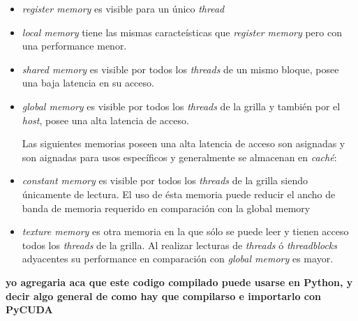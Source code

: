 \begin{itemize}
	\item  \textit{register memory} es visible para un único \textit{thread}
	\item \textit{local memory} tiene las mismas caracteísticas que \textit{register memory} pero con una performance menor.
	\item \textit{shared memory} es visible por todos los \textit{threads} de un mismo bloque, posee una baja latencia en su acceso.
	\item \textit{global memory} es visible por todos los \textit{threads} de la grilla y también por el \textit{host}, posee una alta latencia de acceso.
	
	Las siguientes memorias poseen una alta latencia de acceso son asignadas y son aignadas para usos específicos y generalmente se almacenan en \textit{caché}:
	
	\item \textit{constant memory} es visible por todos los \textit{threads} de la grilla siendo únicamente de lectura. El uso de ésta memoria puede reducir el ancho de banda de memoria requerido en comparación con la {global memory}
	\item \textit{texture memory} es otra memoria en la que sólo se puede leer y tienen acceso todos los \textit{threads} de la grilla. Al realizar lecturas de \textit{threads} ó \textit{threadblocks} adyacentes su performance en comparación con \textit{global memory} es mayor. 
	
\end{itemize}




\textbf{yo agregaria aca que este codigo compilado puede usarse en Python, y decir algo general de como hay que compilarso e importarlo con PyCUDA}


